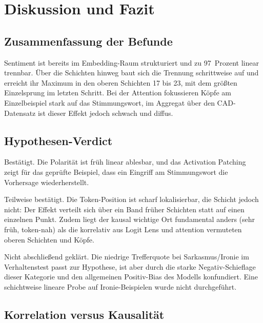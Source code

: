 \section{Diskussion und Fazit}

\subsection{Zusammenfassung der Befunde}

Sentiment ist bereits im Embedding-Raum strukturiert und zu 97~Prozent linear trennbar. Über die Schichten hinweg baut sich die Trennung schrittweise auf und erreicht ihr Maximum in den oberen Schichten 17 bis 23, mit dem größten Einzelsprung im letzten Schritt. Bei der Attention fokussieren Köpfe am Einzelbeispiel stark auf das Stimmungswort, im Aggregat über den CAD-Datensatz ist dieser Effekt jedoch schwach und diffus.

\subsection{Hypothesen-Verdict}

\begin{description}[style=nextline, leftmargin=0pt, font=\bfseries, itemsep=0.4em]
  \item[H1 (klare Stimmungswörter)] Bestätigt. Die Polarität ist früh linear ablesbar, und das Activation Patching zeigt für das geprüfte Beispiel, dass ein Eingriff am Stimmungswort die Vorhersage wiederherstellt.
  \item[H2 (Lokalisierbarkeit)] Teilweise bestätigt. Die Token-Position ist scharf lokalisierbar, die Schicht jedoch nicht: Der Effekt verteilt sich über ein Band früher Schichten statt auf einen einzelnen Punkt. Zudem liegt der kausal wichtige Ort fundamental anders (sehr früh, token-nah) als die korrelativ aus Logit Lens und \gls{attention} vermuteten oberen Schichten und Köpfe.
  \item[H3 (Ironie und Sarkasmus)] Nicht abschließend geklärt. Die niedrige Trefferquote bei Sarkasmus/Ironie im Verhaltenstest passt zur Hypothese, ist aber durch die starke Negativ-Schieflage dieser Kategorie und den allgemeinen Positiv-Bias des Modells konfundiert. Eine schichtweise lineare Probe auf Ironie-Beispielen wurde nicht durchgeführt.
\end{description}

\subsection{Korrelation versus Kausalität}

